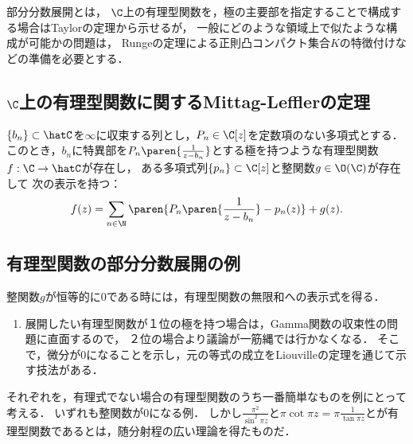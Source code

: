 \documentclass[uplatex, dvipdfmx]{jsreport}
\begin{document}
\begin{tcolorbox}[colframe=ForestGreen, colback=ForestGreen!10!white,breakable,colbacktitle=ForestGreen!40!white,coltitle=black,fonttitle=\bfseries\sffamily,
title=]
    部分分数展開とは，
    $\C$上の有理型関数を，極の主要部を指定することで構成する場合はTaylorの定理から示せるが，
    一般にどのような領域上で似たような構成が可能かの問題は，
    Rungeの定理による正則凸コンパクト集合$K$の特徴付けなどの準備を必要とする．
\end{tcolorbox}

\subsection{$\C$上の有理型関数に関するMittag-Lefflerの定理}

\begin{theorem}
    $\{b_n\}\subset\hatC$を$\infty$に収束する列とし，$P_n\in\C[z]$を定数項のない多項式とする．
    このとき，$b_n$に特異部を$P_n\paren{\frac{1}{z-b_n}}$とする極を持つような有理型関数$f:\C\to\hatC$が存在し，
    ある多項式列$\{p_n\}\subset\C[z]$と整関数$g\in\O(\C)$が存在して
    次の表示を持つ：
    \[f(z)=\sum_{n\in\N}\paren{P_n\paren{\frac{1}{z-b_n}}-p_n(z)}+g(z).\]
\end{theorem}

\subsection{有理型関数の部分分数展開の例}

\begin{tcolorbox}[colframe=ForestGreen, colback=ForestGreen!10!white, breakable ,colbacktitle=ForestGreen!40!white, coltitle=black,fonttitle=\bfseries\sffamily,
    title=有理型関数の部分分数展開]
    整関数$g$が恒等的に$0$である時には，有理型関数の無限和への表示式を得る．
    \begin{enumerate}
        \item 展開したい有理型関数が１位の極を持つ場合は，Gamma関数の収束性の問題に直面するので，
        ２位の場合より議論が一筋縄では行かなくなる．
        そこで，微分が$0$になることを示し，元の等式の成立をLiouvilleの定理を通じて示す技法がある．
    \end{enumerate}
    
    それぞれを，有理式でない場合の有理型関数のうち一番簡単なものを例にとって考える．
    いずれも整関数が$0$になる例．
    しかし$\frac{\pi^2}{\sin^2\pi z}$と$\pi\cot\pi z=\pi\frac{1}{\tan\pi z}$とが有理型関数であるとは，随分射程の広い理論を得たものだ．
\end{tcolorbox}
\end{document}
